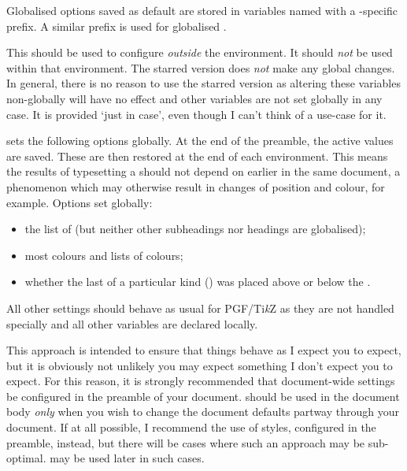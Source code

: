 \documentclass[10pt,british,a4paper]{ltxdoc}
\newcommand*\pkg[1]{\textpkg{#1}}
\newcommand*\Pkg[1]{\textpkg{\MakeUppercase#1}}
\newcommand*\TikZ{Ti\emph{k}Z}
\newcommand*\pgf{PGF}
\begin{document}
Globalised options saved as default are stored in  variables named with a \pkglabelname{}-specific prefix.
A similar prefix is used for globalised \colourslabelname{}.

\DescribeMacro{\chronosset}\AfterLastParam
\DescribeMacro{\chronosset*}\AfterLastParam
This should be used to configure \pkg{chronos} \emph{outside} the  environment.
It should \emph{not} be used within that environment.
The starred version does \emph{not} make any global changes.
In general, there is no reason to use the starred version as altering these variables non-globally will have no effect and other variables are not set globally in any case.
It is provided ‘just in case’, even though I can't think of a use-case for it.

\Pkg{chronos} sets the following options globally.
At the end of the preamble, the active values are saved.
These are then restored at the end of each  environment.
This means the results of typesetting a  should not depend on earlier  in the same document, a phenomenon which may otherwise result in changes of position and colour, for example.
Options set globally:
\begin{itemize}
  \item the list of  (but neither other subheadings nor headings are globalised);
  \item most colours and lists of colours;
  \item whether the last  of a particular kind () was placed above or below the .
\end{itemize}
All other settings should behave as usual for \pgf{}/\TikZ{} as they are not handled specially and all other  variables are declared locally.

This approach is intended to ensure that things behave as I expect you to expect, but it is obviously not unlikely you may expect something I don't expect you to expect.
For this reason, it is strongly recommended that document-wide settings be configured in the preamble of your document.
 should be used in the document body \emph{only} when you wish to change the document defaults partway through your document.
If at all possible, I recommend the use of styles, configured in the preamble, instead, but there will be cases where such an approach may be sub-optimal.
 may be used later in such cases.
\end{document}
